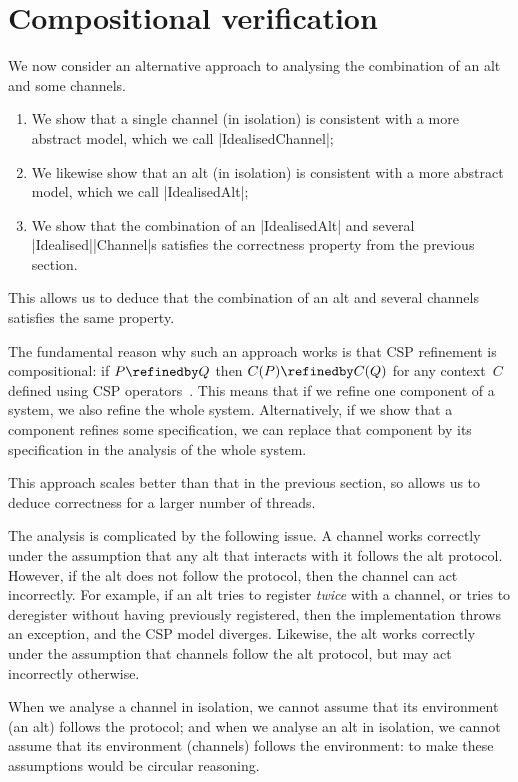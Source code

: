 \section{Compositional verification}
\label{sec:compositional}

\inlineCSP

We now consider an alternative approach to analysing the combination of an alt
and some channels.  
%
\begin{enumerate}
\item We show that a single channel (in isolation) is consistent with a more
  abstract model, which we call |IdealisedChannel|;

\item We likewise show that an alt (in isolation) is consistent with a more
  abstract model, which we call |IdealisedAlt|;

\item We show that the combination of an |IdealisedAlt| and several
  |Idealised|\-|Channel|s satisfies the correctness property from the previous
  section.
\end{enumerate}
%
This allows us to deduce that the combination of an alt and several channels
satisfies the same property.  

The fundamental reason why such an approach works is that CSP refinement is
compositional: if $P \refinedby Q$ then $C(P) \refinedby C(Q)$ for any
context~$C$ defined using CSP operators~\cite{awr:UCS}.  This means that if we
refine one component of a system, we also refine the whole system.
Alternatively, if we show that a component refines some specification, we can
replace that component by its specification in the analysis of the whole
system. 

This approach scales better than that in the previous section, so allows us to
deduce correctness for a larger number of threads.

The analysis is complicated by the following issue.  A channel works correctly
under the assumption that any alt that interacts with it follows the alt
protocol.  However, if the alt does not follow the protocol, then the channel
can act incorrectly.  For example, if an alt tries to register \emph{twice}
with a channel, or tries to deregister without having previously registered,
then the implementation throws an exception, and the CSP model diverges.
Likewise, the alt works correctly under the assumption that channels follow
the alt protocol, but may act incorrectly otherwise.

When we analyse a channel in isolation, we cannot assume that its environment
(an alt) follows the protocol; and when we analyse an alt in isolation, we
cannot assume that its environment (channels) follows the environment: to make
these assumptions would be circular reasoning. 

